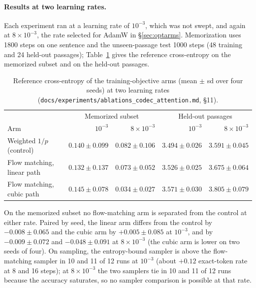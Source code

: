 \documentclass[11pt]{article}
\begin{document}
\paragraph{Results at two learning rates.} Each experiment ran at a learning rate of $10^{-3}$, which was not swept, and
again at $8\times10^{-3}$, the rate selected for AdamW in \S\ref{sec:optarms}. Memorization uses 1800 steps on one sentence and
the unseen-passage test 1000 steps (48 training and 24 held-out passages); Table~\ref{tab:objective} gives the reference
cross-entropy on the memorized subset and on the held-out passages.

\begin{table}[t]
\centering
\small
\begin{tabular}{lrrrr}
\toprule
 & \multicolumn{2}{c}{Memorized subset} & \multicolumn{2}{c}{Held-out passages} \\
Arm & $10^{-3}$ & $8\times10^{-3}$ & $10^{-3}$ & $8\times10^{-3}$ \\
\midrule
Weighted $1/p$ (control) & $0.140 \pm 0.099$ & $0.082 \pm 0.106$ & $3.494 \pm 0.026$ & $3.591 \pm 0.045$ \\
Flow matching, linear path & $0.132 \pm 0.137$ & $0.073 \pm 0.052$ & $3.526 \pm 0.025$ & $3.675 \pm 0.064$ \\
Flow matching, cubic path & $0.145 \pm 0.078$ & $0.034 \pm 0.027$ & $3.571 \pm 0.030$ & $3.805 \pm 0.079$ \\
\bottomrule
\end{tabular}
\caption{Reference cross-entropy of the training-objective arms (mean $\pm$ sd over four seeds) at two
learning rates (\nolinkurl{docs/experiments/ablations_codec_attention.md}, \S11).}
\label{tab:objective}
\end{table}

On the memorized subset no flow-matching arm is separated from the control at either rate. Paired by seed, the linear arm
differs from the control by $-0.008\pm0.065$ and the cubic arm by $+0.005\pm0.085$ at $10^{-3}$, and by
$-0.009\pm0.072$ and $-0.048\pm0.091$ at $8\times10^{-3}$ (the cubic arm is lower on two seeds of four). On sampling,
the entropy-bound sampler is above the flow-matching sampler in 10 and 11 of 12 runs at $10^{-3}$ (about $+0.12$
exact-token rate at 8 and 16 steps); at $8\times10^{-3}$ the two samplers tie in 10 and 11 of 12 runs because the
accuracy saturates, so no sampler comparison is possible at that rate.
\end{document}
